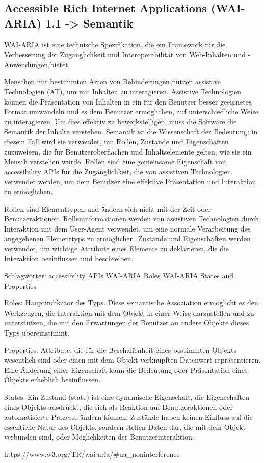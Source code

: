 \subsection{Accessible Rich Internet Applications (WAI-ARIA) 1.1 -> Semantik}

WAI-ARIA ist eine technische Spezifikation, die ein Framework für die Verbesserung der Zugänglichkeit und Interoperabilität von Web-Inhalten und -Anwendungen bietet.

Menschen mit bestimmten Arten von Behinderungen nutzen assistive Technologien (AT), um mit Inhalten zu interagieren. Assistive Technologien können die Präsentation von Inhalten in ein für den Benutzer besser geeignetes Format umwandeln und es dem Benutzer ermöglichen, auf unterschiedliche Weise zu interagieren. Um dies effektiv zu bewerkstelligen, muss die Software die Semantik der Inhalte verstehen. Semantik ist die Wissenschaft der Bedeutung; in diesem Fall wird sie verwendet, um Rollen, Zustände und Eigenschaften zuzuweisen, die für Benutzeroberflächen und Inhaltselemente gelten, wie sie ein Mensch verstehen würde. Rollen sind eine gemeinsame Eigenschaft von accessibility APIs für die Zugänglichkeit, die von assistiven Technologien verwendet werden, um dem Benutzer eine effektive Präsentation und Interaktion zu ermöglichen.

Rollen sind Elementtypen und ändern sich nicht mit der Zeit oder Benutzeraktionen. Rolleninformationen werden von assistiven Technologien durch Interaktion mit dem User-Agent verwendet, um eine normale Verarbeitung des angegebenen Elementtyps zu ermöglichen. Zustände und Eigenschaften werden verwendet, um wichtige Attribute eines Elements zu deklarieren, die die Interaktion beeinflussen und beschreiben. 

Schlagwörter:
accessibility APIs
WAI-ARIA Roles
WAI-ARIA States and Properties

Roles:
Hauptindikator des Typs. Diese semantische Assoziation ermöglicht es den Werkzeugen, die Interaktion mit dem Objekt in einer Weise darzustellen und zu unterstützen, die mit den Erwartungen der Benutzer an andere Objekte dieses Typs übereinstimmt.

Properties:
Attribute, die für die Beschaffenheit eines bestimmten Objekts wesentlich sind oder einen mit dem Objekt verknüpften Datenwert repräsentieren. Eine Änderung einer Eigenschaft kann die Bedeutung oder Präsentation eines Objekts erheblich beeinflussen.


States:
Ein Zustand (state) ist eine dynamische Eigenschaft, die Eigenschaften eines Objekts ausdrückt, die sich als Reaktion auf Benutzeraktionen oder automatisierte Prozesse ändern können. Zustände haben keinen Einfluss auf die essentielle Natur des Objekts, sondern stellen Daten dar, die mit dem Objekt verbunden sind, oder Möglichkeiten der Benutzerinteraktion.

https://www.w3.org/TR/wai-aria/#ua_noninterference
